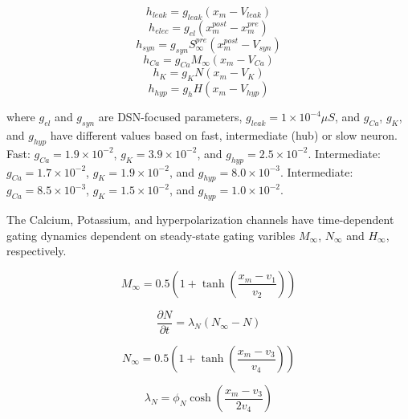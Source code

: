 \documentclass[11pt]{article}
\begin{document}
\begin{equation}  h_{leak} = g_{leak} (x_m - V_{leak}) 
\end{equation} 
\begin{equation}  h_{elec} = g_{el} (x_m^{post} - x_m^{pre})
\end{equation} 
\begin{equation}  h_{syn} = g_{syn} S_\infty^{pre} (x_m^{post} - V_{syn}) \end{equation} 
\begin{equation}  h_{Ca} = g_{Ca} M_\infty (x_m - V_{Ca}) 
\end{equation} 
\begin{equation}  h_K = g_K N (x_m - V_K) 
\end{equation} 
\begin{equation}  h_{hyp} = g_h H(x_m - V_{hyp})
\end{equation} 

where $g_{el}$ and $g_{syn}$ are DSN-focused parameters, $g_{leak} = 1 \times 10^{-4} \mu S$,
and $g_{Ca}$, $g_{K}$, and $g_{hyp}$ have different values based on fast, intermediate (hub)
or slow neuron.  Fast: $g_{Ca} = 1.9 \times 10^{-2}$, $ g_K = 3.9 \times 10^{-2} $,
and $ g_{hyp} = 2.5 \times 10^{-2} $.  Intermediate: $g_{Ca} = 1.7 \times 10^{-2}$,
$ g_K = 1.9 \times 10^{-2} $, and $ g_{hyp} = 8.0 \times 10^{-3} $.  Intermediate:
$g_{Ca} = 8.5 \times 10^{-3}$, $ g_K = 1.5 \times 10^{-2} $, and $ g_{hyp} = 1.0 \times 10^{-2} $.

The Calcium, Potassium, and hyperpolarization channels have time-dependent gating dynamics
dependent on steady-state gating varibles $M_\infty$, $N_\infty$ and $H_\infty$,
respectively.

\begin{equation}  M_{\infty} = 0.5 \left( 1 + \tanh \left( \frac{x_m - v_1}{v_2} \right) \right) \end{equation}

\begin{equation}  \frac{\partial N}{\partial t} = \lambda_N (N_\infty - N) 
\end{equation}

\begin{equation}  N_\infty = 0.5 \left( 1 + \tanh \left( \frac{x_m - v_3}{v_4} \right) \right) 
\end{equation}

\begin{equation}  \lambda_N = \phi_N \cosh \left( \frac{x_m - v_3}{2 v_4} \right) 
\end{equation}
\end{document}
